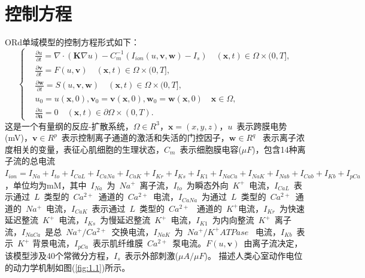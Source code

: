 \documentclass[twoside,UTF8]{nputhesis}
\begin{document}
\section{控制方程}
ORd单域模型的控制方程形式如下：
\begin{equation}
\left\{\begin{aligned}&\frac{\partial u}{\partial t}=\nabla\cdot(\textbf{K}\nabla u)-C_m^{-1}(I_{ion}(u,\textbf{v},\textbf{w})-I_s)\quad (\textbf{x},t)\in\Omega\times(0,T],
\\&\frac{\partial \textbf{v}}{\partial t}=F(u,\textbf{v}) \quad(\textbf{x},t)\in\Omega\times(0,T],
\\&\frac{\partial \textbf{w}}{\partial t}=S(u,\textbf{v},\textbf{w})\quad(\textbf{x},t)\in\Omega\times(0,T],
\\&u_0=u(\textbf{x},0),\textbf{v}_0=\textbf{v}(\textbf{x},0),\textbf{w}_0=\textbf{w}(\textbf{x},0)\quad \textbf{x}\in\Omega,
\\&\frac{\partial u}{\partial \textbf{n}}=0 \quad(\textbf{x},t)\in\partial\Omega\times (0,T).\end{aligned}\right.
\label{ORD}
\end{equation}
这是一个有量纲的反应-扩散系统，$\Omega\in R^3$，$\textbf{x}=(x,y,z)$，$u$~表示跨膜电势(mV)，$\textbf{v}\in R^p$~表示控制离子通道的激活和失活的门控因子，$\textbf{w}\in R^q$~ 表示离子浓度相关的变量，表征心肌细胞的生理状态，$C_m$~表示细胞膜电容($\mu F$)，包含14种离子流的总电流$I_{ion}=I_{Na}+I_{to}+I_{CaL}+I_{CaNa}+I_{CaK}+I_{Kr}+I_{Ks}+I_{K1}+I_{NaCa}+I_{NaK}+I_{Nab}+I_{Cab}+I_{Kb}+I_{pCa}$，单位均为mM，其中~$I_{Na}$~为~$Na^+$~离子流，$I_{to}$~为瞬态外向~$K^+$~电流，$I_{CaL}$~表示通过~$L$~类型的~$Ca^{2+}$~通道的~$Ca^{2+}$~电流，$I_{CaNa}$~为通过~$L$~类型的~$Ca^{2+}$~通道的~$Na^+$~电流，$I_{CaK}$~表示通过~$L$~类型的~$Ca^{2+}$~ 通道的~$K^+$电流，$I_{Kr}$~为快速延迟整流~$K^+$~电流，$I_{Ks}$~为慢延迟整流~$K^+$~电流，$I_{K1}$~为内向整流~$K^+$~离子流，$I_{NaCa}$~是总~$Na^+/Ca^{2+}$~交换电流，$I_{NaK}$~为~$Na^+ / K^+ ATPase$ ~电流，$I_{Kb}$~表示~$K^+$ 背景电流，$I_{pCa}$~表示肌纤维膜~$Ca^{2+}$~泵电流。$F(u,\textbf{v})$~由离子流决定，该模型涉及40个常微分方程，$I_s$~表示外部刺激($\mu A/\mu F$)。
描述人类心室动作电位的动力学机制如图(\ref{fig:1.1})所示。
\end{document}
